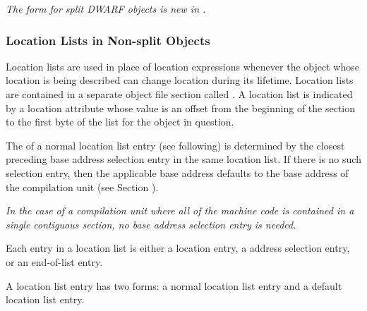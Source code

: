 \textit{The form for split DWARF objects is new in \DWARFVersionV.}

\subsubsection{Location Lists in Non-split Objects}
\label{chap:locationlistsinnonsplitobjects}
Location lists 
are used in place of location expressions
whenever the object whose location is being described
can change location during its lifetime. 
Location lists
are contained in a separate object file section called
\dotdebugloc{}. A location list is indicated by a location
attribute whose value is an offset from the beginning of
the \dotdebugloc{} section to the first byte of the list for the
object in question.

The  of a normal
location list entry (see following) is
determined by the closest preceding base address selection
entry in the same location list. If there is
no such selection entry, then the applicable base address
defaults to the base address of the compilation unit (see
Section ).  

\textit{In the case of a compilation unit where all of
the machine code is contained in a single contiguous section,
no base address selection entry is needed.}

Each entry in a location list is either a location 
entry,
a 
address selection entry, 
or an 
end-of-list entry.

A location list entry has two forms:
a normal location list entry and a default location list entry.

